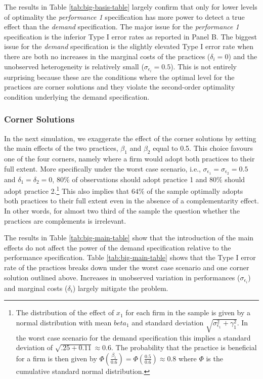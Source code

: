 \documentclass[12pt]{article}
\begin{document}


The results in Table \ref{tab:big-basis-table} largely confirm that only for lower levels of optimality the \emph{performance 1} specification has more power to detect a true effect than the \emph{demand} specification. The major issue for the \emph{performance 1} specification is the inferior Type I error rates as reported in Panel B. The biggest issue for the \emph{demand} specification is the slightly elevated Type I error rate when there are both no increases in the marginal costs of the practices ($\delta_i = 0$) and the unobserved heterogeneity is relatively small ($\sigma_{\epsilon_i} = 0.5$). This is not entirely surprising because these are the conditions where the optimal level for the practices are corner solutions and they violate the second-order optimality condition underlying the demand specification.

\subsubsection{Corner Solutions}

In the next simulation, we exaggerate the effect of the corner solutions by setting the main effects of the two practices, $\beta_{1}$ and $\beta_2$ equal to 0.5. This choice favours one of the four corners, namely where a firm would adopt both practices to their full extent. More specifically under the worst case scenario, i.e., $\sigma_{\epsilon_1} = \sigma_{\epsilon_2} = 0.5$ and $\delta_1 = \delta_2 = 0$, $80\%$ of observations should adopt practice 1 and $80\%$ should adopt practice 2.\footnote{The distribution of the effect of $x_1$ for each firm in the sample is given by a normal distribution with mean $beta_1$ and standard deviation $\sqrt{\sigma_{\epsilon_1}^2 + \gamma_1^2}$. In the worst case scenario for the demand specification this implies a standard deviation of $\sqrt{.25 + 0.11} \approx  0.6$. The probability that the practice is beneficial for a firm is then given by $\Phi(\frac{\beta_1}{0.6}) = \Phi(\frac{0.5}{0.6}) \approx 0.8$ where $\Phi$ is the cumulative standard normal distribution.}
This also implies that $64\%$ of the sample optimally adopts both practices to their full extent even in the absence of a complementarity effect. In other words, for almost two third of the sample the question whether the practices are complements is irrelevant.   



The results in Table \ref{tab:big-main-table} show that the introduction of the main effects do not affect the power of the demand specification relative to the performance specification. Table \ref{tab:big-main-table} shows that the Type I error rate of the practices breaks down under the worst case scenario and one corner solution outlined above. Increases in unobserved variation in performances ($\sigma_{\epsilon_i}$) and marginal costs ($\delta_i$) largely mitigate the problem. 
\end{document}

